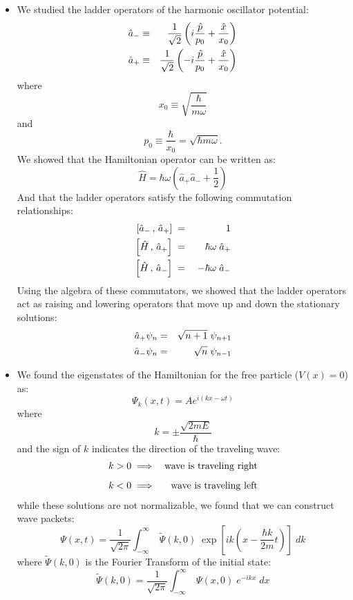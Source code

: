 \documentclass[12pt]{book}
\begin{document}
\begin{itemize}
\item We studied the ladder operators of the harmonic oscillator potential:
\begin{eqnarray}
\hat{a}_- &\equiv& \frac{1}{\sqrt{2}}\left(i \frac{\hat{p}}{p_0} + \frac{\hat{x}}{x_0}\right) \notag \\
\hat{a}_+ &\equiv& \frac{1}{\sqrt{2}}\left(-i \frac{\hat{p}}{p_0} + \frac{\hat{x}}{x_0} \right) \notag \\
\end{eqnarray}
where
$$x_0 \equiv \sqrt{\frac{\hbar}{m \omega}}$$
and
$$p_0 \equiv \frac{\hbar}{x_0} = \sqrt{\hbar m \omega}.$$
We showed that the Hamiltonian operator can be written as:
$$\hat{H} =  \hbar\omega \left( \hat{a}_+ \hat{a}_- + \frac{1}{2} \right)$$
And that the ladder operators satisfy the following commutation relationships:
\begin{eqnarray}
\left[\hat{a}_-\,,\,\hat{a}_+\right] \; &=& \;  1 \notag \\  
\left[\hat{H}\,,\,\hat{a}_+\right]   \; &=& \;  \hbar \omega \; \hat{a}_+ \notag \\ 
\left[\hat{H}\,,\,\hat{a}_-\right]   \; &=& \; -\hbar \omega \; \hat{a}_- \notag \\
\end{eqnarray}
Using the algebra of these commutators, we showed that the ladder operators act as raising and lowering operators that move up and down the stationary solutions:
\begin{eqnarray}
\hat{a}_+ \psi_n &=& \sqrt{n+1} \; \psi_{n+1} \notag \\
\hat{a}_- \psi_n &=& \sqrt{n} \; \psi_{n-1} \notag \\
\end{eqnarray}

\item We found the eigenstates of the Hamiltonian for the free particle ($V(x)=0$) as:
\begin{equation}
\Psi_k(x,t) = A e^{i (k x-\omega t)}
\end{equation}
where
\begin{equation}
k = \pm\frac{\sqrt{2mE}}{\hbar}
\end{equation}
and the sign of $k$ indicates the direction of the traveling wave:
\begin{eqnarray*}
k > 0 &\implies& {\rm wave~is~traveling~right} \\[5pt]
k < 0 &\implies& {\rm wave~is~traveling~left} \\
\end{eqnarray*}
while these solutions are not normalizable, we found that we can construct wave packets:
\begin{equation}
\Psi(x,t) = \frac{1}{\sqrt{2\pi}} \int_{-\infty}^{\infty} \; \widetilde{\Psi}(k,0) \; 
\exp\left[ik\left(x-\frac{\hbar k}{2m}t\right)\right]\; dk 
\end{equation}
where $\widetilde{\Psi}(k,0)$ is the Fourier Transform of the initial state:
\begin{equation}
\widetilde{\Psi}(k,0) = \frac{1}{\sqrt{2\pi}} \int_{-\infty}^{\infty} \; \Psi(x,0) \; e^{-ikx} \; dx 
\end{equation}
\end{itemize}
\end{document}
